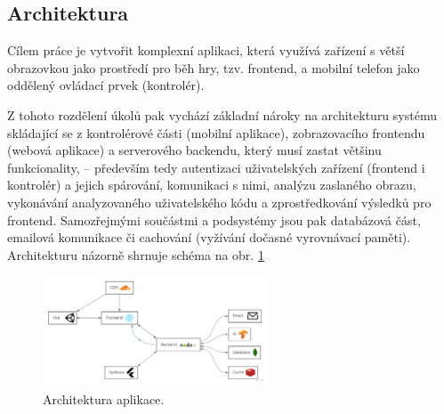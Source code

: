 \subsection{Architektura}

Cílem práce je vytvořit komplexní aplikaci, která využívá zařízení s větší obrazovkou jako prostředí pro běh hry, tzv. frontend, a mobilní telefon jako oddělený ovládací prvek (kontrolér). \par
Z tohoto rozdělení úkolů pak vychází základní nároky na architekturu systému skládající se z kontrolérové části (mobilní aplikace), zobrazovacího frontendu (webová aplikace) a serverového backendu, který musí zastat většinu funkcionality, – především tedy autentizaci uživatelských zařízení (frontend i kontrolér) a jejich spárování, komunikaci s nimi, analýzu zaslaného obrazu, vykonávání analyzovaného uživatelského kódu a zprostředkování výsledků pro frontend. Samozřejmými součástmi a podsystémy jsou pak databázová část, emailová komunikace či cachování (vyžívání dočasné vyrovnávací paměti). Architekturu názorně shrnuje schéma na obr. \ref{fig:architektura}

\begin{figure}[h]
    \centering
    \includegraphics[width=0.6\textwidth]{img/architektura.jpg}
    \caption{Architektura aplikace.}
    \label{fig:architektura}
\end{figure}